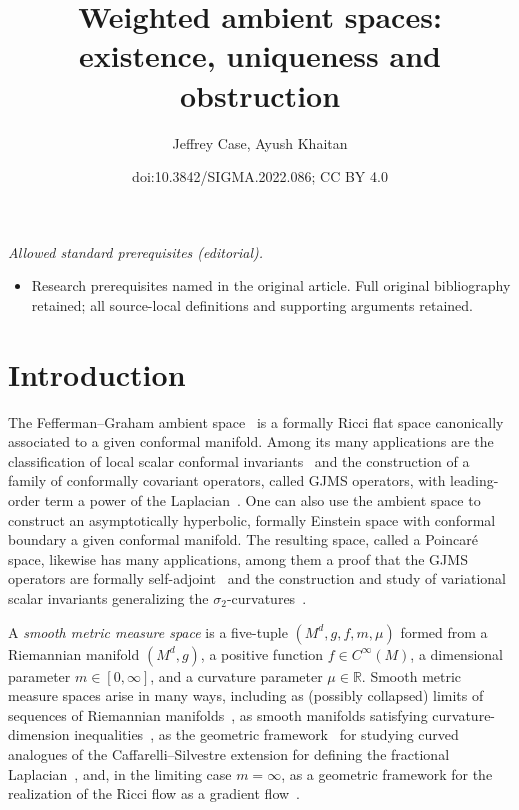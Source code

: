 \documentclass[10pt,a4paper]{amsart}
\title{Weighted ambient spaces: existence, uniqueness and obstruction}
\author{Jeffrey Case, Ayush Khaitan}
\date{doi:10.3842/SIGMA.2022.086; CC BY 4.0}
\newcommand{\bR}{\mathbb{R}}
\numberwithin{equation}{section}
\begin{document}
\maketitle
\noindent\textit{Allowed standard prerequisites (editorial).}\begin{itemize}
\item Research prerequisites named in the original article. Full original bibliography retained; all source-local definitions and supporting arguments retained.
\end{itemize}\medskip
\section{Introduction}

The Fefferman--Graham ambient space~\cite{FeffermanGraham2012} is a formally Ricci flat space canonically associated to a given conformal manifold.
Among its many applications are the classification of local scalar conformal invariants~\cite{BaileyEastwoodGraham1994,Gover2001} and the construction of a family of conformally covariant operators, called GJMS operators, with leading-order term a power of the Laplacian~\cite{GJMS1992}.
One can also use the ambient space to construct an asymptotically hyperbolic, formally Einstein space with conformal boundary a given conformal manifold.
The resulting space, called a Poincar\'e space, likewise has many applications, among them a proof that the GJMS operators are formally self-adjoint~\cite{GrahamZworski2003} and the construction and study of variational scalar invariants generalizing the $\sigma_2$-curvatures~\cite{ChangFang2008,ChangFangGraham2012,Graham2009}.

A \emph{smooth metric measure space} is a five-tuple $(M^d,g,f,m,\mu)$ formed from a Riemannian manifold $(M^d,g)$, a positive function $f\in C^\infty(M)$, a dimensional parameter $m\in[0,\infty]$, and a curvature parameter $\mu\in\bR$. Smooth metric measure spaces arise in many ways, including as (possibly collapsed) limits of sequences of Riemannian manifolds~\cite{CheegerColding2000a}, as smooth manifolds satisfying curvature-dimension inequalities~\cite{BakryEmery1985,Wei_Wylie}, as the geometric framework~\cite{CaseChang2013} for studying curved analogues of the Caffarelli--Silvestre extension for defining the fractional Laplacian~\cite{CaffarelliSilvestre2007}, and, in the limiting case $m=\infty$, as a geometric framework for the realization of the Ricci flow as a gradient flow~\cite{Perelman1}.
\end{document}
